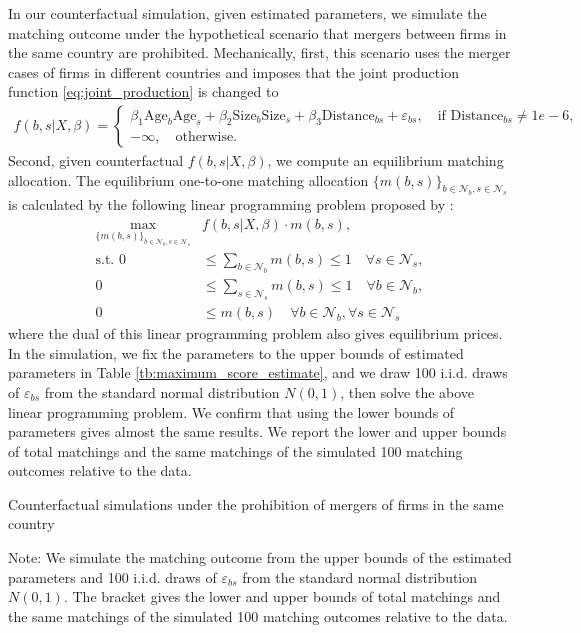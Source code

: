 \documentclass[10pt]{article}
\begin{document}
In our counterfactual simulation, given estimated parameters, we simulate the matching outcome under the hypothetical scenario that mergers between firms in the same country are prohibited. 
Mechanically, first, this scenario uses the merger cases of firms in different countries and imposes that 
the joint production function \eqref{eq:joint_production} is changed to
\begin{align*}
    f(b,s|X,\beta)= \begin{cases}
        \beta_1 \text{Age}_{b}\text{Age}_{s} + \beta_2 \text{Size}_{b}\text{Size}_{s} + \beta_3 \text{Distance}_{bs} + \varepsilon_{bs}, \quad \text{if }\text{Distance}_{bs}\neq 1e-6,\\
        -\infty, \quad \text{otherwise}.
    \end{cases}
\end{align*}
Second, given counterfactual $f(b,s|X,\beta)$, we compute an equilibrium matching allocation. 
The equilibrium one-to-one matching allocation $\{m(b,s)\}_{b\in\mathcal{N}_b,s\in\mathcal{N}_s}$ is calculated by the following linear programming problem proposed by \cite{shapley1971assignment}:
\begin{align*}
    \max_{\{m(b,s)\}_{b\in\mathcal{N}_b,s\in\mathcal{N}_s}} &f(b,s|X,\beta)\cdot m(b,s),\\
    \text{s.t. } 0&\le \sum_{b\in\mathcal{N}_b}m(b,s)\le 1\quad  \forall s \in \mathcal{N}_s,\\
    0&\le \sum_{s\in\mathcal{N}_s}m(b,s)\le 1\quad \forall b \in \mathcal{N}_b,\\
    0&\le m(b,s) \quad \forall b \in \mathcal{N}_b,\forall s \in \mathcal{N}_s
\end{align*}
where the dual of this linear programming problem also gives equilibrium prices. 
In the simulation, we fix the parameters to the upper bounds of estimated parameters in Table \ref{tb:maximum_score_estimate}, and we draw 100 i.i.d. draws of $\varepsilon_{bs}$ from the standard normal distribution $N(0,1)$, then solve the above linear programming problem.
We confirm that using the lower bounds of parameters gives almost the same results.
We report the lower and upper bounds of total matchings and the same matchings of the simulated 100 matching outcomes relative to the data.

\begin{table}[!htbp]
  \begin{center}
      \caption{Counterfactual simulations under the prohibition of mergers of firms in the same country}
      \label{tb:number_of_mergers_counterfactual} 
      
  \end{center}\footnotesize
  Note: We simulate the matching outcome from the upper bounds of the estimated parameters and 100 i.i.d. draws of $\varepsilon_{bs}$ from the standard normal distribution $N(0,1)$. The bracket gives the lower and upper bounds of total matchings and the same matchings of the simulated 100 matching outcomes relative to the data.
\end{table} 
\end{document}
